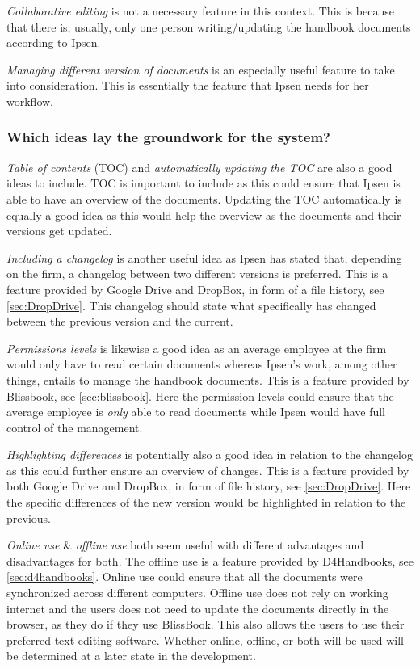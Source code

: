 \textit{Collaborative editing} is not a necessary feature in this context.
This is because that there is, usually, only one person writing/updating the handbook documents according to Ipsen.

\textit{Managing different version of documents} is an especially useful feature to take into consideration.
This is essentially the feature that Ipsen needs for her workflow.

\subsubsection*{Which ideas lay the groundwork for the system?}

\textit{Table of contents} (TOC) and \textit{automatically updating the TOC} are also a good ideas to include.
TOC is important to include as this could ensure that Ipsen is able to have an overview of the documents.
Updating the TOC automatically is equally a good idea as this would help the overview as the documents and their versions get updated.

\textit{Including a changelog} is another useful idea as Ipsen has stated that, depending on the firm, a changelog between two different versions is preferred.
This is a feature provided by Google Drive and DropBox, in form of a file history, see \cref{sec:DropDrive}.
This changelog should state what specifically has changed between the previous version and the current.

\textit{Permissions levels} is likewise a good idea as an average employee at the firm would only have to read certain documents whereas Ipsen's work, among other things, entails to manage the handbook documents.
This is a feature provided by Blissbook, see \cref{sec:blissbook}.
Here the permission levels could ensure that the average employee is \textit{only} able to read documents while Ipsen would have full control of the management.

\textit{Highlighting differences} is potentially also a good idea in relation to the changelog as this could further ensure an overview of changes.
This is a feature provided by both Google Drive and DropBox, in form of file history, see \cref{sec:DropDrive}.
Here the specific differences of the new version would be highlighted in relation to the previous.

\textit{Online use} \& \textit{offline use} both seem useful with different advantages and disadvantages for both.
The offline use is a feature provided by D4Handbooks, see \cref{sec:d4handbooks}.
Online use could ensure that all the documents were synchronized across different computers.
Offline use does not rely on working internet and the users does not need to update the documents directly in the browser, as they do if they use BlissBook.
This also allows the users to use their preferred text editing software.
Whether online, offline, or both will be used will be determined at a later state in the development.

